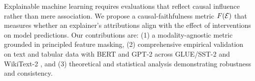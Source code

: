 Explainable machine learning requires evaluations that reflect causal influence rather than mere association. We propose a causal-faithfulness metric $F(\mathcal{E})$ that measures whether an explainer’s attributions align with the effect of interventions on model predictions. Our contributions are: (1) a modality-agnostic metric grounded in principled feature masking, (2) comprehensive empirical validation on text and tabular data with BERT and GPT-2 \citep{devlin2019bert,radford2019gpt2} across GLUE/SST-2 and WikiText-2 \citep{wang2018glue,merity2016wikitext}, and (3) theoretical and statistical analysis demonstrating robustness and consistency.

